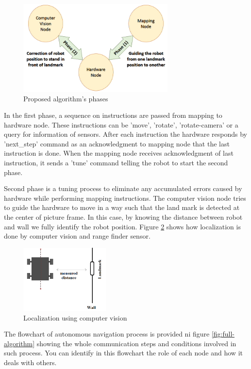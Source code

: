 \documentclass[12pt]{article}
\begin{document}
\begin{figure}
	\centering
	\includegraphics[width=0.7\textwidth]{Fig/Algorithm-phases.png}
	\caption{Proposed algorithm's phases}
	\label{fig:algorithm-phases}
\end{figure}

\noindent In the first phase, a sequence on instructions are passed from mapping to hardware node. These instructions can be 'move', 'rotate', 'rotate-camera' or a query for information of sensors. After each instruction the hardware responds by 'next\_step' command as an acknowledgment to mapping node that the last instruction is done. When the mapping node receives acknowledgment of last instruction, it sends a 'tune' command telling the robot to start the second phase. 

\noindent Second phase is a tuning process to eliminate any accumulated errors caused by hardware while performing mapping instructions. The computer vision node tries to guide the hardware to move in a way such that the land mark is detected at the center of picture frame. In this case, by knowing the distance between robot and wall we fully identify the robot position. Figure \ref{fig:localization} shows how localization is done by computer vision and range finder sensor.
\begin{figure}[H]
	\centering
	\includegraphics[width =0.4\textwidth]{Fig/localization.png}
	\caption{Localization using computer vision}
	\label{fig:localization}
\end{figure}

\noindent The flowchart of autonomous navigation process is provided ni figure \ref{fig:full-algorithm} showing the whole communication steps and conditions involved in such process. You can identify in this flowchart the role of each node and how it deals with others.
\end{document}
